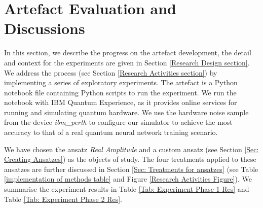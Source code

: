 \section{Artefact Evaluation and Discussions} \label{Result section}

In this section, we describe the progress on the artefact development, the detail and context for the experiments are given in Section \ref{Research Design section}.
We address the process (see Section \ref{Research Activities section}) by implementing a series of exploratory experiments.
The artefact is a Python notebook file containing Python scripts to run the experiment.
We run the notebook with IBM Quantum Experience, as it provides online services for running and simulating quantum hardware.
We use the hardware noise sample from the device \emph{ibm\_perth} to configure our simulator to achieve the most accuracy to that of a real quantum neural network training scenario.

We have chosen the ansatz \emph{Real Amplitude} and a custom ansatz (see Section \ref{Sec: Creating Ansatzes}) as the objects of study.
The four treatments applied to these ansatzes are further discussed in Section \ref{Sec: Treatments for ansatzes} (see Table \ref{implementation of methods table} and Figure \ref{Research Activities Figure}).
We summarise the experiment results in Table \ref{Tab: Experiment Phase 1 Res} and Table \ref{Tab: Experiment Phase 2 Res}.



% 

% 

% 

% 

% 




